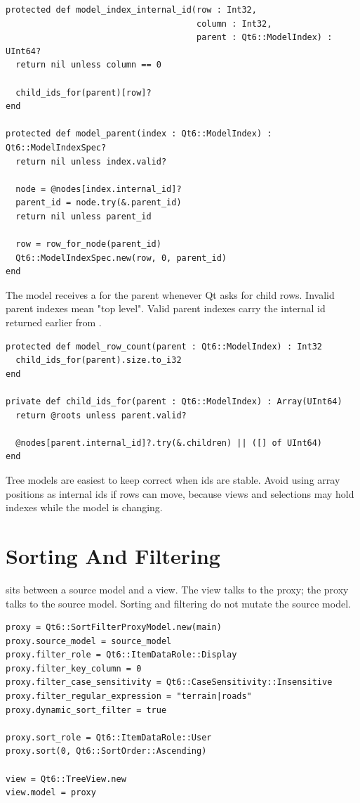 \begin{lstlisting}[style=crystal]
protected def model_index_internal_id(row : Int32,
                                      column : Int32,
                                      parent : Qt6::ModelIndex) : UInt64?
  return nil unless column == 0

  child_ids_for(parent)[row]?
end

protected def model_parent(index : Qt6::ModelIndex) : Qt6::ModelIndexSpec?
  return nil unless index.valid?

  node = @nodes[index.internal_id]?
  parent_id = node.try(&.parent_id)
  return nil unless parent_id

  row = row_for_node(parent_id)
  Qt6::ModelIndexSpec.new(row, 0, parent_id)
end
\end{lstlisting}

The model receives a  for the parent whenever Qt asks for child rows. Invalid parent indexes mean "top level". Valid parent indexes carry the internal id returned earlier from .

\begin{lstlisting}[style=crystal]
protected def model_row_count(parent : Qt6::ModelIndex) : Int32
  child_ids_for(parent).size.to_i32
end

private def child_ids_for(parent : Qt6::ModelIndex) : Array(UInt64)
  return @roots unless parent.valid?

  @nodes[parent.internal_id]?.try(&.children) || ([] of UInt64)
end
\end{lstlisting}

Tree models are easiest to keep correct when ids are stable. Avoid using array positions as internal ids if rows can move, because views and selections may hold indexes while the model is changing.

\section{Sorting And Filtering}

 sits between a source model and a view. The view talks to the proxy; the proxy talks to the source model. Sorting and filtering do not mutate the source model.

\begin{lstlisting}[style=crystal]
proxy = Qt6::SortFilterProxyModel.new(main)
proxy.source_model = source_model
proxy.filter_role = Qt6::ItemDataRole::Display
proxy.filter_key_column = 0
proxy.filter_case_sensitivity = Qt6::CaseSensitivity::Insensitive
proxy.filter_regular_expression = "terrain|roads"
proxy.dynamic_sort_filter = true

proxy.sort_role = Qt6::ItemDataRole::User
proxy.sort(0, Qt6::SortOrder::Ascending)

view = Qt6::TreeView.new
view.model = proxy
\end{lstlisting}

